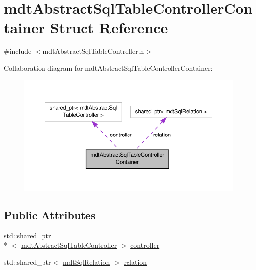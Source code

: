 \hypertarget{structmdt_abstract_sql_table_controller_container}{\section{mdt\-Abstract\-Sql\-Table\-Controller\-Container Struct Reference}
\label{structmdt_abstract_sql_table_controller_container}
}


{\ttfamily \#include $<$mdt\-Abstract\-Sql\-Table\-Controller.\-h$>$}



Collaboration diagram for mdt\-Abstract\-Sql\-Table\-Controller\-Container\-:
\nopagebreak
\begin{figure}[H]
\begin{center}
\leavevmode
\includegraphics[width=350pt]{structmdt_abstract_sql_table_controller_container__coll__graph}
\end{center}
\end{figure}
\subsection*{Public Attributes}
\begin{DoxyCompactItemize}
\item 
std\-::shared\-\_\-ptr\\*
$<$ \hyperlink{classmdt_abstract_sql_table_controller}{mdt\-Abstract\-Sql\-Table\-Controller} $>$ \hyperlink{structmdt_abstract_sql_table_controller_container_a78aed5460ebf7f78d18ac80bb855fa39}{controller}
\item 
std\-::shared\-\_\-ptr$<$ \hyperlink{classmdt_sql_relation}{mdt\-Sql\-Relation} $>$ \hyperlink{structmdt_abstract_sql_table_controller_container_ac628635f902685e4c5c15f7cc2327af9}{relation}
\end{DoxyCompactItemize}


